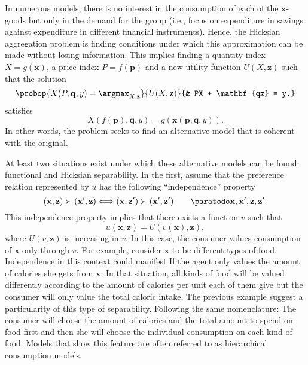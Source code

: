 \documentclass[english, a4paper,12pt]{article}
\begin{document}
In numerous models, there is no interest in the consumption of each of the $\mathbf{x}$-goods but only in the demand for the group (i.e., focus on expenditure in savings against expenditure in different financial instruments). Hence, the Hicksian aggregation problem is finding conditions under which this approximation can be made without losing information. This implies finding a quantity index $X = g(\mathbf{x})$, a price index $P = f(\mathbf{p})$ and a new utility function $U(X, \mathbf{z})$ such that the solution 
	 \begin{equation} \label{eq:hickaggprob}
		\probop{X(P, \mathbf{q}, y) = \argmax_{X, \mathbf{z}}}{U(X, \mathbf{z})}
					{&	PX + \mathbf{qz} = y.}
	\end{equation}
satisfies
	$$X(f(\mathbf{p}), \mathbf{q}, y) = g(\mathbf{x}(\mathbf{p}, \mathbf{q}, y)).$$
In other words, the problem seeks to find an alternative model that is coherent with the original. 

At least two situations exist under which these alternative models can be found: functional and Hicksian separability. In the first, assume that the preference relation represented by $u$ has the following ``independence'' property
	$$(\mathbf{x}, \mathbf{z}) \succ (\mathbf{x}', \mathbf{z}) 
		\Longleftrightarrow (\mathbf{x}, \mathbf{z}') \succ (\mathbf{x}', \mathbf{z}') \qquad \paratodo \mathbf{x}, \mathbf{x}', \mathbf{z}, \mathbf{z}'.$$
This independence property implies that there exists a function $v$ such that
	$$u(\mathbf{x}, \mathbf{z}) = U(v(\mathbf{x}), \mathbf{z}),$$
where $U(v,\mathbf{z})$ is increasing in $v$. In this case, the consumer values consumption of $\mathbf{x}$ only through $v$. For example, consider $\mathbf{x}$ to be different types of food. Independence in this context could manifest If the agent only values the amount of calories she gets from $\mathbf{x}$. In that situation, all kinds of food will be valued differently according to the amount of calories per unit each of them give but the consumer will only value the total caloric intake. The previous example suggest a particularity of this type of separability. Following the same nomenclature: The consumer will choose the amount of calories and the total amount to spend on food first and then she will choose the individual consumption on each kind of food. Models that show this feature are often referred to as hierarchical consumption models.
\end{document}
